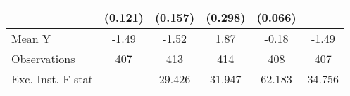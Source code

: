 {\begin{tabular}{l*{5}{c}}
            &     (0.121)         &     (0.157)         &     (0.298)         &     (0.066)         &                     \\
\midrule
Mean Y      &       -1.49         &       -1.52         &        1.87         &       -0.18         &       -1.49         \\
Observations&         407         &         413         &         414         &         408         &         407         \\
Exc. Inst. F-stat&                     &      29.426         &      31.947         &      62.183         &      34.756         \\
\bottomrule
\end{tabular}
}
